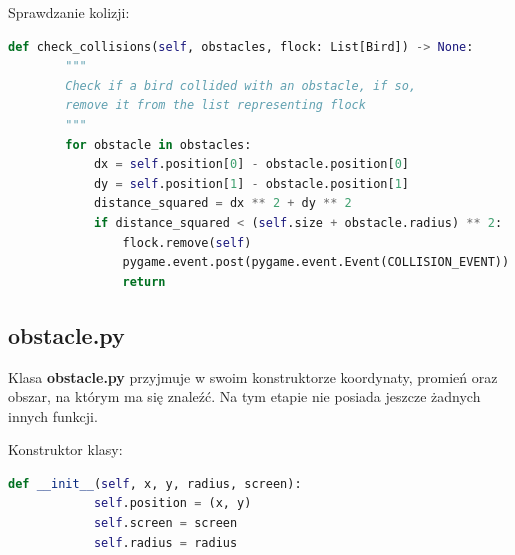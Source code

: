 \documentclass[12pt,a4paper,table]{article}
\begin{document}
    \raggedright

     Sprawdzanie kolizji:
    \begin{lstlisting}[language=Python]
    def check_collisions(self, obstacles, flock: List[Bird]) -> None:
        """
        Check if a bird collided with an obstacle, if so, 
        remove it from the list representing flock
        """
        for obstacle in obstacles:
            dx = self.position[0] - obstacle.position[0]
            dy = self.position[1] - obstacle.position[1]
            distance_squared = dx ** 2 + dy ** 2
            if distance_squared < (self.size + obstacle.radius) ** 2:
                flock.remove(self)
                pygame.event.post(pygame.event.Event(COLLISION_EVENT))
                return
    \end{lstlisting}
    
    \subsection{obstacle.py}
    Klasa \textbf{obstacle.py} przyjmuje w swoim konstruktorze koordynaty, promień oraz obszar, na którym ma się znaleźć. Na tym etapie nie posiada jeszcze żadnych innych funkcji.

    Konstruktor klasy:
    \begin{lstlisting}[language=Python]
        def __init__(self, x, y, radius, screen):
            self.position = (x, y)
            self.screen = screen
            self.radius = radius
    \end{lstlisting}
\end{document}

